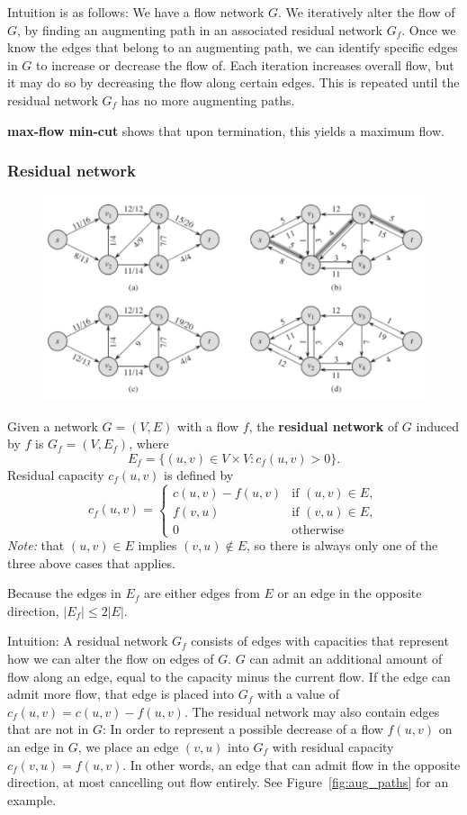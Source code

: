 Intuition is as follows: We have a flow network $G$. We iteratively alter the flow of $G$, 
by finding an augmenting path in an associated residual network $G_f$. Once we know the edges
that belong to an augmenting path, we can identify specific edges in $G$ to increase or decrease
the flow of. Each iteration increases overall flow, but it may do so by decreasing the flow along
certain edges. This is repeated until the residual network $G_f$ has no more augmenting paths.

\textbf{max-flow min-cut} shows that upon termination, this yields a maximum flow.

\subsubsection{Residual network}
\begin{figure}
	\centering
	\includegraphics[width=\textwidth]{images/augmenting_paths}
\end{figure}
Given a network $G = (V,E)$ with a flow $f$, the \textbf{residual network}
of $G$ induced by $f$ is $G_f = (V, E_f)$, where
\[
	E_f = \{(u,v) \in V \times V : c_f(u,v) > 0\}.
\]
Residual capacity $c_f(u,v)$ is defined by
\[
 c_f(u,v) =
  \begin{cases}
  	c(u,v) - f(u,v) & \text{if } (u,v) \in E, \\
  	f(v,u) & \text{if } (v,u) \in E, \\
  	0 & \text{otherwise}
  \end{cases}
\]
\textit{Note:} that $(u,v) \in E$ implies $(v,u) \notin E$, so there is always only one of the three
above cases that applies. 

Because the edges in $E_f$ are either edges from $E$ or an edge in the opposite direction,
$|E_f| \leq 2|E|$.

Intuition: A residual network $G_f$ consists of edges with capacities that
represent how we can alter the flow on edges of $G$. $G$ can admit an
additional amount of flow along an edge, equal to the capacity minus the
current flow. If the edge can admit more flow, that edge is placed into $G_f$
with a value of $c_f(u,v) = c(u,v) - f(u,v)$. The residual network may also
contain edges that are not in $G$: In order to represent a possible decrease
of a flow $f(u,v)$ on an edge in $G$, we place an edge $(v,u)$ into $G_f$ with
residual capacity $c_f(v,u) = f(u,v)$. In other words, an edge that can admit
flow in the opposite direction, at most cancelling out flow entirely. See
Figure~\ref{fig:aug_paths} for an example.

